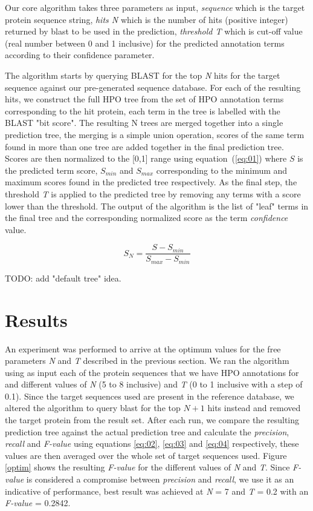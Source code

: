 \documentclass{bioinfo}
\begin{document}
Our core algorithm takes three parameters as input, \textit{sequence} which is the target protein sequence string, \textit{hits N} which is the number of hits (positive integer) returned by blast to be used in the prediction, \textit{threshold T} which is cut-off value (real number between 0 and 1 inclusive) for the predicted annotation terms according to their confidence parameter.

The algorithm starts by querying BLAST for the top \textit{N} hits for the target sequence against our pre-generated sequence database. For each of the resulting hits, we construct the full HPO tree from the set of HPO annotation terms corresponding to the hit protein, each term in the tree is labelled with the BLAST "bit score". The resulting N trees are merged together into a single prediction tree, the merging is a simple union operation, scores of the same term found in more than one tree are added together in the final prediction tree. Scores are then normalized to the [0,1] range using equation~(\ref{eq:01}) where $S$ is the predicted term score, $S_{min}$ and $S_{max}$ corresponding to the minimum and maximum scores found in the predicted tree respectively. As the final step, the threshold \textit{T} is applied to the predicted tree by removing any terms with a score lower than the threshold. The output of the algorithm is the list of "leaf" terms in the final tree and the corresponding normalized score as the term \textit{confidence} value.

\begin{equation}
S_N = \frac{S - S_{min}}{S_{max} - S_{min}}
\label{eq:01}
\end{equation}

TODO: add "default tree" idea.

\section{Results}

An experiment was performed to arrive at the optimum values for the free parameters \textit{N} and \textit{T} described in the previous section. We ran the algorithm using as input each of the protein sequences that we have HPO annotations for and different values of \textit{N} (5 to 8 inclusive) and \textit{T} (0 to 1 inclusive with a step of 0.1). Since the target sequences used are present in the reference database, we altered the algorithm to query blast for the top $N + 1$ hits instead and removed the target protein from the result set. After each run, we compare the resulting prediction tree against the actual prediction tree and calculate the \textit{precision}, \textit{recall} and \textit{F-value} using equations \ref{eq:02}, \ref{eq:03} and \ref{eq:04} respectively, these values are then averaged over the whole set of target sequences used. Figure \ref{optim} shows the resulting \textit{F-value} for the different values of \textit{N} and \textit{T}. Since \textit{F-value} is considered a compromise between \textit{precision} and \textit{recall}, we use it as an indicative of performance, best result was achieved at \textit{N} = 7 and \textit{T} = 0.2 with an \textit{F-value} = 0.2842.
\end{document}

